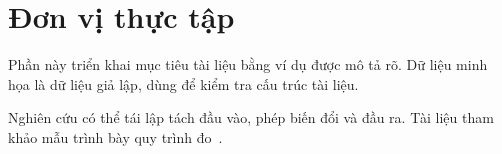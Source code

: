 \chapter{Đơn vị thực tập}


\label{sec:chapter1}
Phần này triển khai mục tiêu tài liệu bằng ví dụ được mô tả rõ. Dữ liệu minh họa là dữ liệu giả lập, dùng để kiểm tra cấu trúc tài liệu.

Nghiên cứu có thể tái lập tách đầu vào, phép biến đổi và đầu ra. Tài liệu tham khảo mẫu trình bày quy trình đo~\cite{example}.

